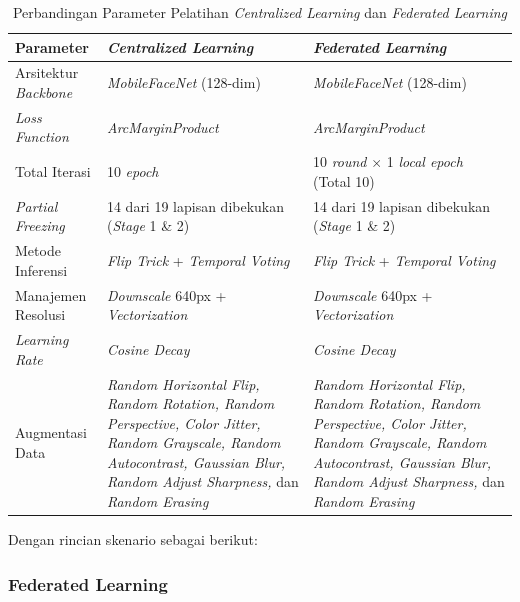 \begin{table}[H]
  \centering
  \footnotesize
  \caption{Perbandingan Parameter Pelatihan \textit{Centralized Learning} dan \textit{Federated Learning}}
  \label{tab:perbandingan-parameter-pelatihan}
  \begin{tabular}{|p{3.2cm}|p{5.8cm}|p{5.8cm}|}
    \hline
    \textbf{Parameter} & \textbf{\textit{Centralized Learning}} & \textbf{\textit{Federated Learning}} \\
    \hline
    Arsitektur \textit{Backbone} & \textit{MobileFaceNet} (128-dim) & \textit{MobileFaceNet} (128-dim) \\
    \hline
    \textit{Loss Function} & \textit{ArcMarginProduct} & \textit{ArcMarginProduct} \\
    \hline
    Total Iterasi & 10 \textit{epoch} & 10 \textit{round} $\times$ 1 \textit{local epoch} (Total 10) \\
    \hline
    \textit{Partial Freezing} & 14 dari 19 lapisan dibekukan (\textit{Stage} 1 \& 2) & 14 dari 19 lapisan dibekukan (\textit{Stage} 1 \& 2) \\
    \hline
    Metode Inferensi & \textit{Flip Trick} + \textit{Temporal Voting} & \textit{Flip Trick} + \textit{Temporal Voting} \\
    \hline
    Manajemen Resolusi & \textit{Downscale} 640px + \textit{Vectorization} & \textit{Downscale} 640px + \textit{Vectorization} \\
    \hline
    \textit{Learning Rate} & \textit{Cosine Decay} & \textit{Cosine Decay} \\
    \hline
    Augmentasi Data &
    \textit{Random Horizontal Flip, Random Rotation, Random Perspective, Color Jitter, Random Grayscale, Random Autocontrast, Gaussian Blur, Random Adjust Sharpness,} dan \textit{Random Erasing} &
    \textit{Random Horizontal Flip, Random Rotation, Random Perspective, Color Jitter, Random Grayscale, Random Autocontrast, Gaussian Blur, Random Adjust Sharpness,} dan \textit{Random Erasing} \\
    \hline
  \end{tabular}
\end{table}


Dengan rincian skenario sebagai berikut:

\subsubsection{Federated Learning}

